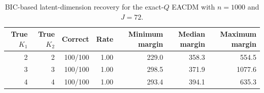\begin{table}[ht]
\centering
\caption{BIC-based latent-dimension recovery for the exact-$Q$ EACDM with $n=1000$ and $J=72$.}
\begin{tabular}{rrrrrrr}
\toprule
True $K_1$ & True $K_2$ & Correct & Rate & Minimum margin & Median margin & Maximum margin \\
\midrule
2 & 2 & 100/100 & 1.00 & 229.0 & 358.3 & 554.5 \\
3 & 3 & 100/100 & 1.00 & 298.5 & 371.9 & 1077.6 \\
4 & 4 & 100/100 & 1.00 & 293.4 & 394.1 & 635.3 \\
\bottomrule
\end{tabular}
\label{tab:eacdm_big_model_selection_j72}
\end{table}
